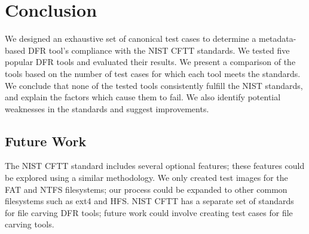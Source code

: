\section{Conclusion}

We designed an exhaustive set of canonical test cases to determine a metadata-based DFR tool's compliance with the NIST CFTT standards.
We tested five popular DFR tools and evaluated their results.
We present a comparison of the tools based on the number of test cases for which each tool meets the standards.
We conclude that none of the tested tools consistently fulfill the NIST standards, and explain the factors which cause them to fail.
We also identify potential weaknesses in the standards and suggest improvements.

\subsection{Future Work}
The NIST CFTT standard includes several optional features; these features could be explored using a similar methodology.
We only created test images for the FAT and NTFS filesystems; our process could be expanded to other common filesystems such as ext4 and HFS.
NIST CFTT has a separate set of standards for file carving DFR tools; future work could involve creating test cases for file carving tools.
